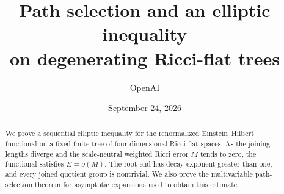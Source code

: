 \documentclass[11pt]{article}
\title{Path selection and an elliptic inequality\\on degenerating Ricci-flat trees}
\author{OpenAI}
\date{September 24, 2026}
\begin{document}
\maketitle
\begin{abstract}
We prove a sequential elliptic inequality for the renormalized
Einstein--Hilbert functional on a fixed finite tree of four-dimensional
Ricci-flat spaces. As the joining lengths diverge and the scale-neutral
weighted Ricci error $M$ tends to zero, the functional satisfies $E=o(M)$.
The root end has decay exponent greater than one, and every joined quotient
group is nontrivial. We also prove the multivariable path-selection theorem
for asymptotic expansions used to obtain this estimate.
\end{abstract}
\begingroup
\small
\tableofcontents
\endgroup







\begingroup
\small


\endgroup
\end{document}
